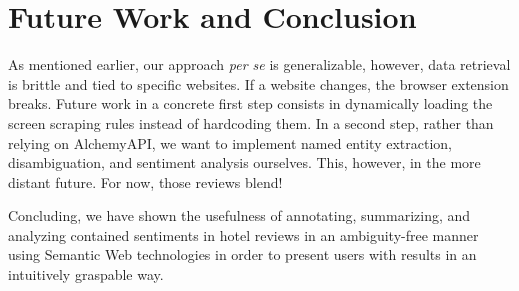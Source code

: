 \documentclass[runningheads,a4paper]{llncs}
\begin{document}
\vspace{-12.5mm}
\section{Future Work and Conclusion}
As mentioned earlier, our approach \emph{per se} is generalizable, however, data retrieval is brittle and tied to specific websites. If a website changes, the browser extension breaks. Future work in a concrete first step consists in dynamically loading the screen scraping rules instead of hardcoding them. In a second step, rather than relying on AlchemyAPI, we want to implement named entity extraction, disambiguation, and sentiment analysis ourselves. This, however, in the more distant future. For now, those reviews blend!

Concluding, we have shown the usefulness of annotating, summarizing, and analyzing contained sentiments in hotel reviews in an ambiguity-free manner using Semantic Web technologies in order to present users with results in an intuitively graspable way.

\renewcommand{\ttdefault}{cmvtt}
\renewcommand\UrlFont\tt



\end{document}
